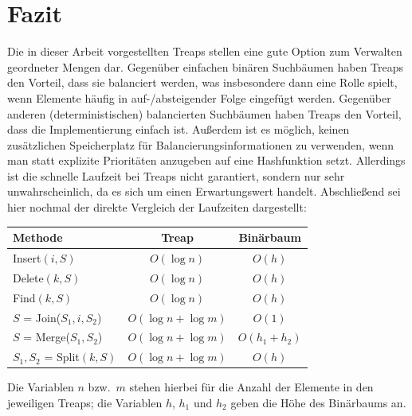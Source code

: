 \documentclass[a4paper]{scrreprt}
\theoremstyle{definition}
\begin{document}
\chapter{Fazit}
\label{sec:closing}
Die in dieser Arbeit vorgestellten Treaps stellen eine gute Option zum Verwalten geordneter Mengen dar.
Gegenüber einfachen binären Suchbäumen haben Treaps den Vorteil, dass sie balanciert werden, was insbesondere dann eine Rolle spielt, wenn Elemente häufig in auf-/absteigender Folge eingefügt werden.
Gegenüber anderen (deterministischen) balancierten Suchbäumen haben Treaps den Vorteil, dass die Implementierung einfach ist.
Außerdem ist es möglich, keinen zusätzlichen Speicherplatz für Balancierungsinformationen zu verwenden, wenn man statt explizite Prioritäten anzugeben auf eine Hashfunktion setzt.
Allerdings ist die schnelle Laufzeit bei Treaps nicht garantiert, sondern nur sehr unwahrscheinlich, da es sich um einen Erwartungswert handelt.
Abschließend sei hier nochmal der direkte Vergleich der Laufzeiten dargestellt:

\vspace{1em}
\begin{tabular}{l | c | c }
        Methode & Treap & Binärbaum\\
        \hline
        Insert$(i, S)$ & $O(\log n)$ & $O(h)$ \\
        Delete$(k, S)$ & $O(\log n)$ & $O(h)$ \\
        Find$(k, S)$ & $O(\log n)$ & $O(h)$ \\
        $S$ = Join($S_1, i, S_2$) & $O(\log n + \log m)$ & $O(1)$ \\
        $S$ = Merge($S_1, S_2$) & $O(\log n + \log m)$ & $O(h_1 + h_2)$ \\
        $S_1, S_2$ = Split$(k, S)$ & $O(\log n + \log m)$ & $O(h)$
        \end{tabular}

Die Variablen $n$ bzw.\ $m$ stehen hierbei für die Anzahl der Elemente in den jeweiligen Treaps; die Variablen $h$, $h_1$ und $h_2$ geben die Höhe des Binärbaums an.







\end{document}
